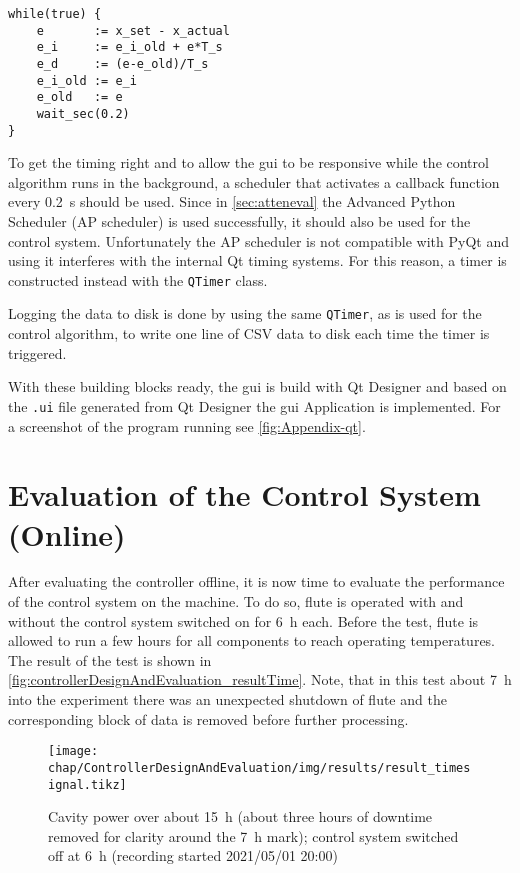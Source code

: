 \begin{lstlisting}[caption = PID controller implemented in pseudo code, label = lst:controllerDesignAndEvaluation-pidcode]
while(true) {
    e       := x_set - x_actual
    e_i     := e_i_old + e*T_s
    e_d     := (e-e_old)/T_s
    e_i_old := e_i
    e_old   := e
    wait_sec(0.2)
}
\end{lstlisting}

To get the timing right and to allow the \gls{gui} to be responsive while the control algorithm runs in the background, a scheduler that activates a callback function every \SI{0.2}{\second} should be used. Since in \autoref{sec:atteneval} the Advanced Python Scheduler (AP scheduler) is used successfully, it should also be used for the control system. Unfortunately the AP scheduler is not compatible with PyQt and using it interferes with the internal Qt timing systems. For this reason, a timer is constructed instead with the  \texttt{QTimer} class.\cite{qtimer}

Logging the data to disk is done by using the same \texttt{QTimer}, as is used for the control algorithm, to write one line of CSV data to disk each time the timer is triggered.

With these building blocks ready, the \gls{gui} is build with Qt Designer and based on the \texttt{.ui} file generated from Qt Designer the \gls{gui} Application is implemented. For a screenshot of the program running see \autoref{fig:Appendix-qt}.









\newpage
\section{Evaluation of the Control System (Online)}
After evaluating the controller offline, it is now time to evaluate the performance of the control system on the machine. To do so, \gls{flute} is operated with and without the control system switched on for \SI{6}{\hour} each. Before the test, \gls{flute} is allowed to run a few hours for all components to reach operating temperatures.
The result of the test is shown in \autoref{fig:controllerDesignAndEvaluation_resultTime}.
Note, that in this test about \SI{7}{\hour} into the experiment there was an unexpected shutdown of \gls{flute} and the corresponding block of data is removed before further processing.

\begin{figure}[tb]
	\centering
	\texttt{[image: chap/ControllerDesignAndEvaluation/img/results/result\_timesignal.tikz]}
	\caption{Cavity power over about \SI{15}{\hour} (about three hours of downtime removed for clarity around the \SI{7}{\hour} mark); control system switched off at \SI{6}{\hour} (recording started 2021/05/01 20:00)}
	\label{fig:controllerDesignAndEvaluation_resultTime}
\end{figure}

